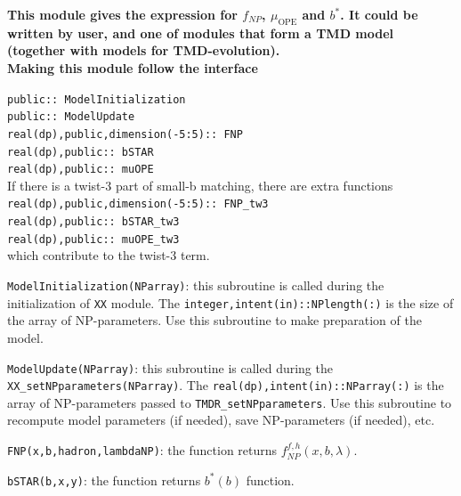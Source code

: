 \documentclass[prd,nofootinbib,eqsecnum,final]{revtex4}
\renewcommand{\(}{\left(}
\renewcommand{\)}{\right)}
\renewcommand{\[}{\left[}
\renewcommand{\]}{\right]}
\newcommand{\blue}[1]{{\color{blue} #1}}
\begin{document}
\begin{tcolorbox}
\begin{center}
\textbf{This module gives the expression for $f_{NP}$, $\mu_{\text{OPE}}$ and $b^*$. It could be written by user, and one of modules that form a TMD model (together with models for TMD-evolution).}
\\
\textbf{\blue{Making this module follow the interface}}
\end{center}
\texttt{public:: ModelInitialization}
\\
\texttt{public:: ModelUpdate}
\\
\texttt{real(dp),public,dimension(-5:5):: FNP}
\\
\texttt{real(dp),public:: bSTAR}
\\
\texttt{real(dp),public:: muOPE}
\\
If there is a twist-3 part of small-b matching, there are extra functions
\\
\texttt{real(dp),public,dimension(-5:5):: FNP\_tw3}
\\
\texttt{real(dp),public:: bSTAR\_tw3}
\\
\texttt{real(dp),public:: muOPE\_tw3}
\\
which contribute to the twist-3 term.
\end{tcolorbox}

\texttt{ModelInitialization(NParray)}: this subroutine is called during the initialization of \texttt{XX} module. The \texttt{integer,intent(in)::NPlength(:)} is the size of the array of NP-parameters. Use this subroutine to make preparation of the model.

\vspace{2mm}

\texttt{ModelUpdate(NParray)}: this subroutine is called during the \texttt{XX\_setNPparameters(NParray)}. The \texttt{real(dp),intent(in)::NParray(:)} is the array of NP-parameters passed to \texttt{TMDR\_setNPparameters}. Use this subroutine to recompute model parameters (if needed), save NP-parameters (if needed), etc.

\vspace{2mm}

\texttt{FNP(x,b,hadron,lambdaNP)}: the function returns $f^{f,h}_{NP}(x,b,\lambda)$. 

\vspace{2mm}

\texttt{bSTAR(b,x,y)}: the function returns $b^*(b)$ function.

\vspace{2mm}
\end{document}
